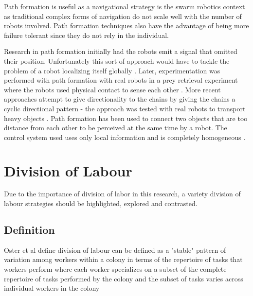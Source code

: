 Path formation is useful as a navigational strategy is the swarm robotics context as traditional complex forms of navigation do not scale well with the number of robots involved. Path formation techniques also have the advantage of being more failure tolerant since they do not rely in the individual.

Research in path formation initially had the robots emit a signal that omitted their position. Unfortunately this sort of approach would have to tackle the problem of a robot localizing itself globally \cite{goss1992harvesting}. Later, experimentation was performed with path formation with real robots in a prey retrieval experiment where the robots used physical contact to sense each other \cite{werger1996robotic}. More recent approaches attempt to give directionality to the chains by giving the chains a cyclic directional pattern - the approach was tested with real robots to transport heavy objects \cite{nouyan2006group}. Path formation has been used to connect two objects that are too distance from each other to be perceived at the same time by a robot. The control system used uses only local information and is completely homogeneous \cite{nouyan2006chain}.


\section{Division of Labour}
\label{chap:divisionoflabour}
Due to the importance of division of labor in this research, a variety division of labour strategies should be highlighted, explored and contrasted. 






\subsection{Definition}
\label{sec:second:definition}

Oster et al \cite{oster1978caste} define division of labour can be defined as a "stable" pattern of variation among workers within a colony in terms of the repertoire of tasks that workers perform where each worker specializes on a subset of the complete repertoire of tasks performed by the colony and the subset of tasks varies across individual workers in the colony %

